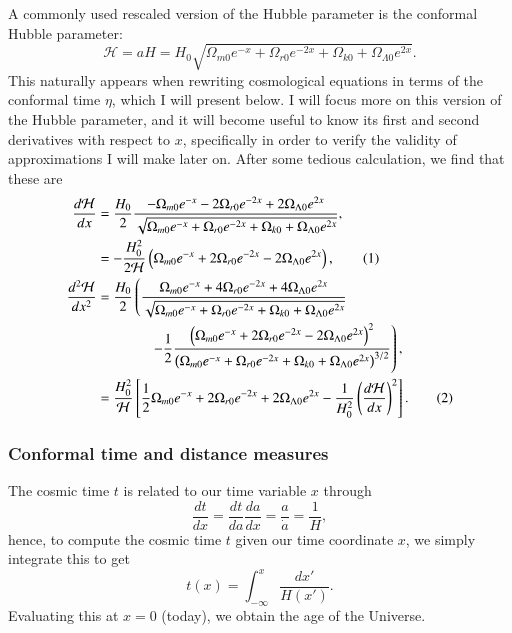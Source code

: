 \documentclass{aa}
\newcommand\numberthis{\addtocounter{equation}{1}\tag{\theequation}}
\begin{document}
A commonly used rescaled version of the Hubble parameter is the conformal Hubble parameter:
\begin{equation}
    \mathcal{H} = aH = H_0 \sqrt{\Omega_{m0} e^{-x} + \Omega_{r0} e^{-2x} + \Omega_{k0} + \Omega_{\Lambda 0}e^{2x}}. \label{eq:Hp}
\end{equation}
This naturally appears when rewriting cosmological equations in terms of the conformal time $\eta$, which I will present below. I will focus more on this version of the Hubble parameter, and it will become useful to know its first and second derivatives with respect to $x$, specifically in order to verify the validity of approximations I will make later on. After some tedious calculation, we find that these are
\begin{align*}
    \frac{d\mathcal{H}}{dx} &= \frac{H_0}{2}
    \frac{-\Omega_{m0}e^{-x} - 2\Omega_{r0}e^{-2x} + 2\Omega_{\Lambda0}e^{2x}}
    {\sqrt{\Omega_{m0}e^{-x} 
    + \Omega_{r0}e^{-2x}
    + \Omega_{k0} + \Omega_{\Lambda0}e^{2x}}},
    \\
    &= -\frac{H_0^2}{2\mathcal{H}}\left(\Omega_{m0}e^{-x} + 2\Omega_{r0}e^{-2x} - 2\Omega_{\Lambda0}e^{2x}\right), \numberthis \label{eq:dHpdx}
    \\
    \frac{d^2\mathcal{H}}{dx^2} &= \frac{H_0}{2}
    \left(\frac{\Omega_{m0}e^{-x} + 4\Omega_{r0}e^{-2x} + 4\Omega_{\Lambda0}e^{2x}}{\sqrt{\Omega_{m0}e^{-x} + \Omega_{r0}e^{-2x} + \Omega_{k0} + \Omega_{\Lambda0}e^{2x}}}\right.
    \\
    &\hspace{38pt}
    \left.- \frac{1}{2}\frac{\left(\Omega_{m0}e^{-x} + 2\Omega_{r0}e^{-2x} - 2\Omega_{\Lambda0}e^{2x}\right)^2}{\left(\Omega_{m0}e^{-x} + \Omega_{r0}e^{-2x} + \Omega_{k0} + \Omega_{\Lambda0}e^{2x}\right)^{3/2}}\right),
    \\
    &= \frac{H_0^2}{\mathcal{H}}\left[\frac{1}{2}\Omega_{m0}e^{-x} + 2\Omega_{r0}e^{-2x} + 2\Omega_{\Lambda0}e^{2x}- \frac{1}{H_0^2}\left(\frac{d\mathcal{H}}{dx}\right)^2\right]. \numberthis \label{eq:ddHpddx}
  \end{align*}


\subsubsection{Conformal time and distance measures}
The cosmic time $t$ is related to our time variable $x$ through
\begin{equation}
  \frac{dt}{dx} = \frac{dt}{da}\frac{da}{dx} = \frac{a}{\dot{a}} = \frac{1}{H},
\end{equation}
hence, to compute the cosmic time $t$ given our time coordinate $x$, we simply integrate this to get 
\begin{equation}
  t(x) = \int_{-\infty}^{x} \frac{dx'}{H(x')}.
\end{equation}
Evaluating this at $x=0$ (today), we obtain the age of the Universe.
\end{document}
